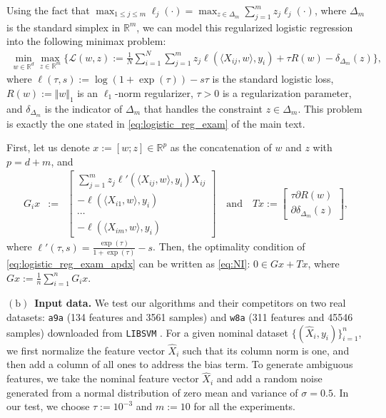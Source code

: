 \documentclass{article}
\newcommand{\R}{\mathbb{R}}
\newcommand{\sets}[1]{\{#1\}}
\newcommand{\norms}[1]{\Vert#1\Vert}
\newcommand{\iprods}[1]{\langle #1\rangle}
\theoremstyle{plain}
\theoremstyle{definition}
\theoremstyle{remark}
\begin{document}
Using the fact that $\max_{1\leq j\leq m}\ell_j(\cdot) = \max_{z \in\Delta_m}\sum_{j=1}^m z_j \ell_j(\cdot)$, where $\Delta_m$ is  the standard simplex in $\R^m$, we can model this regularized logistic regression into the following minimax problem:
\begin{equation}\label{eq:logistic_reg_exam_apdx}
\begin{array}{lcl}
{\displaystyle\min_{w \in\R^d}} {\displaystyle\max_{z \in \R^m }} \Big\{ \mathcal{L}(w, z) := \frac{1}{N} \sum_{i=1}^{N} \sum_{j=1}^m z_j  \ell ( \iprods{X_{ij}, w}, y_i ) + \tau R(w) - \delta_{\Delta_m}(z) \Big\},
\end{array}
\end{equation}
where  $\ell(\tau, s) := \log(1 + \exp(\tau)) - s\tau$ is the standard logistic loss,  $R(w) := \norms{w}_1$ is an $\ell_1$-norm regularizer, $\tau > 0$ is a regularization parameter, and $\delta_{\Delta_m}$ is the indicator of $\Delta_m$ that handles the constraint $z \in \Delta_m$.
This problem is exactly the one stated in \eqref{eq:logistic_reg_exam} of the main text.

First, let us denote $x := [w; z] \in \R^p$ as the concatenation of $w$ and $z$ with $p = d+m$, and
\begin{equation*}
\begin{array}{lcl}
G_ix & := &  \begin{bmatrix} \sum_{j=1}^mz_j \ell'(\iprods{X_{ij},w}, y_i) X_{ij} \\ -\ell(\iprods{X_{i1}, w}, y_i)\\ 
\cdots\\
-\ell(\iprods{X_{im}, w}, y_i) \end{bmatrix} \quad \text{and}  \quad Tx :=  \begin{bmatrix} \tau \partial{R}(w)\\ \partial{\delta_{\Delta_m}}(z)\end{bmatrix}, 
\end{array}
\end{equation*}
where $\ell'(\tau, s) = \frac{\exp(\tau)}{1+\exp(\tau)} - s$.
Then, the optimality condition of \eqref{eq:logistic_reg_exam_apdx} can be written as \eqref{eq:NI}: $0 \in Gx + Tx$, where $Gx := \frac{1}{n} \sum_{i=1}^nG_ix$.

$\mathrm{(b)}$~\textbf{Input data.}
We test our algorithms and their competitors on two real datasets: \texttt{a9a} (134 features and 3561 samples) and \texttt{w8a} (311 features and 45546 samples)  downloaded from \texttt{LIBSVM} \citep{CC01a}.
For a given nominal dataset $\sets{(\hat{X}_i, y_i)}_{i=1}^n$, we first normalize the feature vector $\hat{X}_i$ such that its column norm is one,  and then add a column of  all ones to address the bias term.
To generate ambiguous features, we take the nominal feature vector $\hat{X}_i$ and add a random noise generated from a normal distribution of zero mean and variance of $\sigma = 0.5$.
In our test, we choose $\tau := 10^{-3}$ and $m := 10$ for all the experiments.
\end{document}

